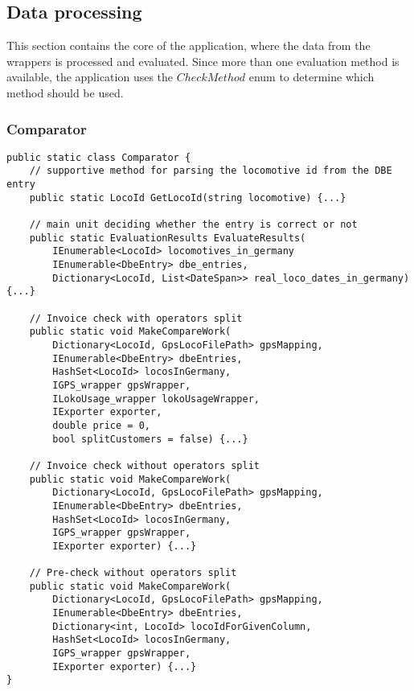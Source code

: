 \documentclass[11pt]{article}
\begin{document}
\pagebreak

\subsection{Data processing}
\label{sec:DataProcessing}

This section contains the core of the application, where the data from the wrappers is processed and evaluated. Since more than one evaluation method is available, the application uses the \begin{math}CheckMethod\end{math} enum to determine which method should be used.

\subsubsection{Comparator}
\label{sec:Comparator}

\begin{verbatim}
public static class Comparator {
    // supportive method for parsing the locomotive id from the DBE entry
    public static LocoId GetLocoId(string locomotive) {...}

    // main unit deciding whether the entry is correct or not
    public static EvaluationResults EvaluateResults(
        IEnumerable<LocoId> locomotives_in_germany
        IEnumerable<DbeEntry> dbe_entries, 
        Dictionary<LocoId, List<DateSpan>> real_loco_dates_in_germany) {...}

    // Invoice check with operators split
    public static void MakeCompareWork(
        Dictionary<LocoId, GpsLocoFilePath> gpsMapping, 
        IEnumerable<DbeEntry> dbeEntries, 
        HashSet<LocoId> locosInGermany, 
        IGPS_wrapper gpsWrapper, 
        ILokoUsage_wrapper lokoUsageWrapper, 
        IExporter exporter, 
        double price = 0, 
        bool splitCustomers = false) {...}  

    // Invoice check without operators split
    public static void MakeCompareWork(
        Dictionary<LocoId, GpsLocoFilePath> gpsMapping, 
        IEnumerable<DbeEntry> dbeEntries, 
        HashSet<LocoId> locosInGermany, 
        IGPS_wrapper gpsWrapper, 
        IExporter exporter) {...}

    // Pre-check without operators split
    public static void MakeCompareWork(
        Dictionary<LocoId, GpsLocoFilePath> gpsMapping, 
        IEnumerable<DbeEntry> dbeEntries, 
        Dictionary<int, LocoId> locoIdForGivenColumn, 
        HashSet<LocoId> locosInGermany, 
        IGPS_wrapper gpsWrapper, 
        IExporter exporter) {...}
}
\end{verbatim}
\end{document}

